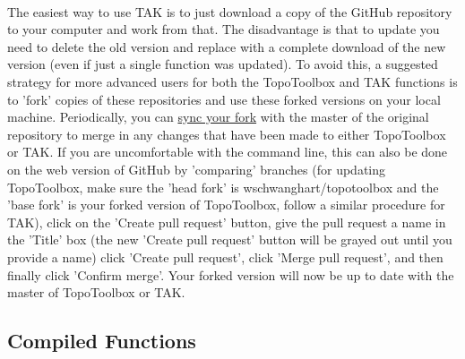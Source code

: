 \paragraph{}The easiest way to use TAK is to just download a copy of the GitHub repository to your computer and work from that. The disadvantage is that to update you need to delete the old version and replace with a complete download of the new version (even if just a single function was updated). To avoid this, a suggested strategy for more advanced users for both the TopoToolbox and TAK functions is to 'fork' copies of these repositories and use these forked versions on your local machine. Periodically, you can \href{https://help.github.com/articles/syncing-a-fork/}{sync your fork} with the master of the original repository to merge in any changes that have been made to either TopoToolbox or TAK. If you are uncomfortable with the command line, this can also be done on the web version of GitHub by 'comparing' branches (for updating TopoToolbox, make sure the 'head fork' is wschwanghart/topotoolbox and the 'base fork' is your forked version of TopoToolbox, follow a similar procedure for TAK), click on the 'Create pull request' button, give the pull request a name in the 'Title' box (the new 'Create pull request' button will be grayed out until you provide a name) click 'Create pull request', click 'Merge pull request', and then finally click 'Confirm merge'. Your forked version will now be up to date with the master of TopoToolbox or TAK.

\subsection{Compiled Functions} \label{sec:CmpFunc}
